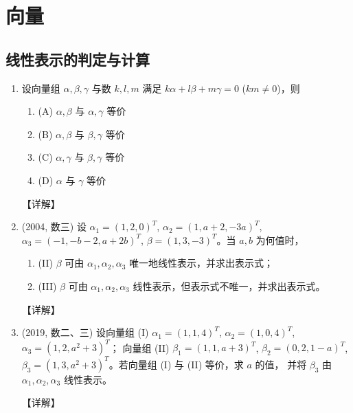\documentclass[12pt, a4paper, oneside, UTF8]{ctexbook}
\begin{document}
% 
\else
\fi

\chapter{向量}

\section{线性表示的判定与计算}

\begin{enumerate}[label=\arabic*.]
    \item 设向量组 $\alpha, \beta, \gamma$ 与数 $k, l, m$ 满足 $k\alpha + l\beta + m\gamma = 0$ ($km \neq 0$)，则
    \begin{enumerate}
        \item (A) $\alpha, \beta$ 与 $\alpha, \gamma$ 等价
        \item (B) $\alpha, \beta$ 与 $\beta, \gamma$ 等价
        \item (C) $\alpha, \gamma$ 与 $\beta, \gamma$ 等价
        \item (D) $\alpha$ 与 $\gamma$ 等价
    \end{enumerate}
    
    \begin{solution}
    【详解】
    \end{solution}
    
    \item (2004, 数三) 设 $\alpha_1 = (1,2,0)^T$, $\alpha_2 = (1, a+2, -3a)^T$, $\alpha_3 = (-1, -b-2, a+2b)^T$,
    $\beta = (1,3,-3)^T$。当 $a, b$ 为何值时，
    \begin{enumerate}
        \item (II) $\beta$ 可由 $\alpha_1, \alpha_2, \alpha_3$ 唯一地线性表示，并求出表示式；
        \item (III) $\beta$ 可由 $\alpha_1, \alpha_2, \alpha_3$ 线性表示，但表示式不唯一，并求出表示式。
    \end{enumerate}
    
    \begin{solution}
    【详解】
    \end{solution}
    
    \item (2019, 数二、三) 设向量组 (I) $\alpha_1 = (1,1,4)^T$, $\alpha_2 = (1,0,4)^T$, $\alpha_3 = (1,2, a^2+3)^T$；
    向量组 (II) $\beta_1 = (1,1, a+3)^T$, $\beta_2 = (0,2,1-a)^T$, $\beta_3 = (1,3, a^2+3)^T$。若向量组 (I) 与 (II) 等价，求 $a$ 的值，
    并将 $\beta_3$ 由 $\alpha_1, \alpha_2, \alpha_3$ 线性表示。
    
    \begin{solution}
    【详解】
    \end{solution}
\end{enumerate}
\end{document}
